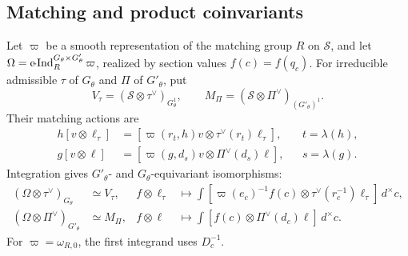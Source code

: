 \subsection{Matching and product coinvariants}
\begin{lemma}\label{gu:app:comparison}\label{fun:reverse-comparison}\label{fun:forward-comparison}
Let $\varpi$ be a smooth representation of the matching group $R$ on
$\mathscr S$, and let $\Omega=\operatorname{c\!-Ind}_R^{G_\theta\times G'_\theta}\varpi$, realized
by section values $f(c)=f(q_c)$. For irreducible admissible $\tau$ of
$G_\theta$ and $\Pi$ of $G'_\theta$, put
\[
 V_\tau=(\mathscr S\otimes\tau^\vee)_{G_\theta^1},\qquad
 M_\Pi=(\mathscr S\otimes\Pi^\vee)_{(G'_\theta)^1}.
\]
Their matching actions are
\begin{align}
 h[v\otimes\ell_\tau]
  &=[\varpi(r_t,h)v\otimes\tau^\vee(r_t)\ell_\tau],
     &&t=\lambda(h),\label{gu:eq:forward-matching-action}\\
 g[v\otimes\ell]
  &=[\varpi(g,d_s)v\otimes\Pi^\vee(d_s)\ell],
     &&s=\lambda(g).\label{gu:eq:reverse-matching-action}
\end{align}
Integration gives $G'_\theta$- and $G_\theta$-equivariant isomorphisms:
\begin{align}
 (\Omega\otimes\tau^\vee)_{G_\theta}&\simeq V_\tau,
 &f\otimes\ell_\tau&\longmapsto
 \int[\varpi(e_c)^{-1}f(c)\otimes\tau^\vee(r_c^{-1})\ell_\tau]\,d^\times c,
 \label{gu:eq:forward-comparison}\\
 (\Omega\otimes\Pi^\vee)_{G'_\theta}&\simeq M_\Pi,
 &f\otimes\ell&\longmapsto
 \int[f(c)\otimes\Pi^\vee(d_c)\ell]\,d^\times c.
 \label{gu:asm:quotient-integral}
\end{align}
For $\varpi=\omega_{R,0}$, the first integrand uses $D_c^{-1}$.
\end{lemma}
